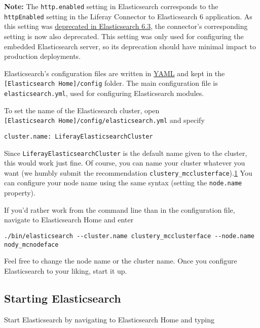 \noindent\hrulefill

\textbf{Note:} The \texttt{http.enabled} setting in Elasticsearch
corresponds to the \texttt{httpEnabled} setting in the Liferay Connector
to Elasticsearch 6 application. As this setting was
\href{https://www.elastic.co/guide/en/elasticsearch/reference/current/release-notes-6.3.0.html\#deprecation-6.3.0}{deprecated
in Elasticsearch 6.3}, the connector's corresponding setting is now also
deprecated. This setting was only used for configuring the embedded
Elasticsearch server, so its deprecation should have minimal impact to
production deployments.

\noindent\hrulefill

Elasticsearch's configuration files are written in
\href{http://www.yaml.org}{YAML} and kept in the
\texttt{{[}Elasticsearch\ Home{]}/config} folder. The main configuration
file is \texttt{elasticsearch.yml}, used for configuring Elasticsearch
modules.

To set the name of the Elasticsearch cluster, open
\texttt{{[}Elasticsearch\ Home{]}/config/elasticsearch.yml} and specify

\begin{verbatim}
cluster.name: LiferayElasticsearchCluster
\end{verbatim}

Since \texttt{LiferayElasticsearchCluster} is the default name given to
the cluster, this would work just fine. Of course, you can name your
cluster whatever you want (we humbly submit the recommendation
\texttt{clustery\_mcclusterface}).\hyperref[footnote1]{1} You can
configure your node name using the same syntax (setting the
\texttt{node.name} property).

If you'd rather work from the command line than in the configuration
file, navigate to Elasticsearch Home and enter

\begin{verbatim}
./bin/elasticsearch --cluster.name clustery_mcclusterface --node.name nody_mcnodeface
\end{verbatim}

Feel free to change the node name or the cluster name. Once you
configure Elasticsearch to your liking, start it up.

\subsection{Starting Elasticsearch}\label{starting-elasticsearch}

Start Elasticsearch by navigating to Elasticsearch Home and typing

